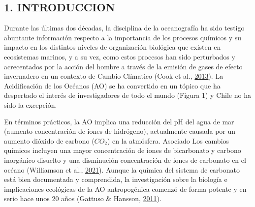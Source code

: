 \documentclass[
]{article}
\begin{document}
\hypersetup{linkcolor = blue}

\fontsize{12}{26}
\selectfont{}

\hypertarget{introduccion}{%
\subsection{1. INTRODUCCION}\label{introduccion}}

\quad

Durante las últimas dos décadas, la disciplina de la oceanografía ha
sido testigo abuntante información respecto a la importancia de los
procesos químicos y su impacto en los distintos niveles de organización
biológica que existen en ecosistemas marinos, y a su vez, como estos
procesos han sido perturbados y acrecentados por la acción del hombre a
través de la emisión de gases de efecto invernadero en un contexto de
Cambio Clímatico (Cook et al., \protect\hyperlink{ref-Cook2013b}{2013}).
La Acidificación de los Océanos (AO) se ha convertido en un tópico que
ha despertado el interés de investigadores de todo el mundo (Figura 1) y
Chile no ha sido la excepción.

En términos prácticos, la AO implica una reducción del pH del agua de
mar (aumento concentración de iones de hidrógeno), actualmente causada
por un aumento dióxido de carbono (\({CO}_{2}\)) en la atmósfera.
Asociado Los cambios químicos incluyen una mayor concentración de iones
de bicarbonato y carbono inorgánico disuelto y una disminución
concentración de iones de carbonato en el océano (Williamson et al.,
\protect\hyperlink{ref-Williamson2021}{2021}). Aunque la química del
sistema de carbonato está bien documentada y comprendida, la
investigación sobre la biología e implicaciones ecológicas de la AO
antropogénica comenzó de forma potente y en serio hace unos 20 años
(Gattuso \& Hansson, \protect\hyperlink{ref-Gattuso2011}{2011}).
\end{document}
